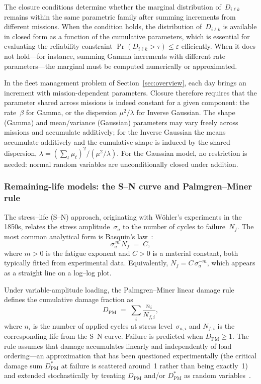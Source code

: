 \documentclass[11pt,a4paper]{article}
\theoremstyle{plain}
\theoremstyle{definition}
\theoremstyle{remark}
\begin{document}
The closure conditions determine whether the marginal distribution of~$D_{i\ell k}$ remains within the same parametric family after summing increments from different missions.
When the condition holds, the distribution of~$D_{i\ell k}$ is available in closed form as a function of the cumulative parameters, which is essential for evaluating the reliability constraint $\Pr(D_{i\ell k} > \tau) \le \varepsilon$ efficiently.
When it does not hold---for instance, summing Gamma increments with different rate parameters---the marginal must be computed numerically or approximated.

In the fleet management problem of Section~\ref{sec:overview}, each day brings an increment with mission-dependent parameters.
Closure therefore requires that the parameter shared across missions is indeed constant for a given component: the rate~$\beta$ for Gamma, or the dispersion $\mu^2/\lambda$ for Inverse Gaussian.
The shape (Gamma) and mean/variance (Gaussian) parameters may vary freely across missions and accumulate additively; for the Inverse Gaussian the means accumulate additively and the cumulative shape is induced by the shared dispersion, $\lambda = (\sum_t \mu_t)^2\big/(\mu^2/\lambda)$.
For the Gaussian model, no restriction is needed: normal random variables are unconditionally closed under addition.

\subsubsection{Remaining-life models: the S--N curve and Palmgren--Miner rule}

The stress--life (S--N) approach, originating with W\"ohler's experiments in the 1850s, relates the stress amplitude~$\sigma_a$ to the number of cycles to failure~$N_f$.
The most common analytical form is Basquin's law~\cite{Basquin1910}:
\begin{equation}\label{eq:basquin}
  \sigma_a^{\,m}\, N_f \;=\; C,
\end{equation}
where $m>0$ is the fatigue exponent and $C>0$ is a material constant, both typically fitted from experimental data.
Equivalently, $N_f = C\,\sigma_a^{-m}$, which appears as a straight line on a log--log plot.

Under variable-amplitude loading, the Palmgren--Miner linear damage rule~\cite{Palmgren1924,Miner1945} defines the cumulative damage fraction as
\begin{equation}\label{eq:miner}
  D_{\mathrm{PM}} \;=\; \sum_{i} \frac{n_i}{N_{f,i}},
\end{equation}
where $n_i$ is the number of applied cycles at stress level~$\sigma_{a,i}$ and $N_{f,i}$ is the corresponding life from the S--N curve.
Failure is predicted when $D_{\mathrm{PM}} \ge 1$.
The rule assumes that damage accumulates linearly and independently of load ordering---an approximation that has been questioned experimentally (the critical damage sum $D_{\mathrm{PM}}^*$ at failure is scattered around~1 rather than being exactly~1) and extended stochastically by treating $D_{\mathrm{PM}}$ and/or $D_{\mathrm{PM}}^*$ as random variables~\cite{Shen1980,CastilloFernandezCanteli2009,Hilow2017,BohmEtAl2021,MunizCalvente2022}.
\end{document}
